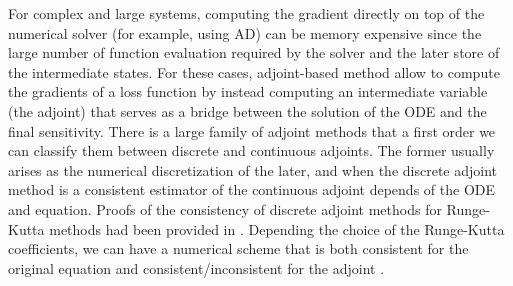 For complex and large systems, computing the gradient directly on top of the numerical solver (for example, using AD) can be memory expensive since the large number of function evaluation required by the solver and the later store of the intermediate states. 
For these cases, adjoint-based method allow to compute the gradients of a loss function by instead computing an intermediate variable (the adjoint) that serves as a bridge between the solution of the ODE and the final sensitivity. 
There is a large family of adjoint methods that a first order we can classify them between discrete and continuous adjoints. 
The former usually arises as the numerical discretization of the later, and when the discrete adjoint method is a consistent estimator of the continuous adjoint depends of the ODE and equation.  
Proofs of the consistency of discrete adjoint methods for Runge-Kutta methods had been provided in \cite{sandu2006properties, sandu2011solution}.
Depending the choice of the Runge-Kutta coefficients, we can have a numerical scheme that is both consistent for the original equation and consistent/inconsistent for the adjoint \cite{Hager_2000}.
